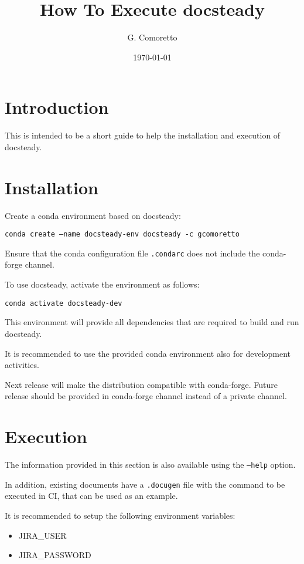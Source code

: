 \documentclass[DM]{lsstdoc}
\author{G. Comoretto}
\begin{document}
\date{\today}

\title{How To Execute docsteady}
\mkshorttitle

\section{Introduction}

This is intended to be a short guide to help the installation and  execution of docsteady.


\section{Installation}

Create a conda environment based on docsteady:

\texttt{conda create --name docsteady-env docsteady -c gcomoretto}

Ensure that the conda configuration file  \texttt{.condarc} does not include the conda-forge channel.

To use docsteady, activate the environment as follows:

\texttt{conda activate docsteady-dev}

This environment will provide all dependencies that are required to build and run docsteady.

It is recommended to use the provided conda environment also for development activities.

Next release will make the distribution compatible with conda-forge. Future release should be provided in conda-forge channel instead of a private channel.


\section{Execution}

The information provided in this section is also available using the \texttt{--help} option.

In addition, existing documents have a \texttt{.docugen} file with the command to be executed in CI, that can be used as an example.

It is recommended to setup the following environment variables:

\begin{itemize}
\item JIRA\_USER
\item JIRA\_PASSWORD
\end{itemize}
\end{document}
